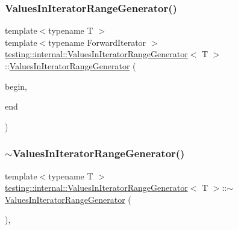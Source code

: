 \subsubsection{\texorpdfstring{Values\+In\+Iterator\+Range\+Generator()}{ValuesInIteratorRangeGenerator()}}
{\footnotesize\ttfamily template$<$typename T $>$ \\
template$<$typename Forward\+Iterator $>$ \\
\hyperlink{classtesting_1_1internal_1_1ValuesInIteratorRangeGenerator}{testing\+::internal\+::\+Values\+In\+Iterator\+Range\+Generator}$<$ T $>$\+::\hyperlink{classtesting_1_1internal_1_1ValuesInIteratorRangeGenerator}{Values\+In\+Iterator\+Range\+Generator} (\begin{DoxyParamCaption}\item[{Forward\+Iterator}]{begin,  }\item[{Forward\+Iterator}]{end }\end{DoxyParamCaption})\hspace{0.3cm}{\ttfamily [inline]}}

\mbox{\label{classtesting_1_1internal_1_1ValuesInIteratorRangeGenerator_a9070d5b79803164625d3aa77a1659e9f}} 
\subsubsection{\texorpdfstring{$\sim$\+Values\+In\+Iterator\+Range\+Generator()}{~ValuesInIteratorRangeGenerator()}}
{\footnotesize\ttfamily template$<$typename T $>$ \\
\hyperlink{classtesting_1_1internal_1_1ValuesInIteratorRangeGenerator}{testing\+::internal\+::\+Values\+In\+Iterator\+Range\+Generator}$<$ T $>$\+::$\sim$\hyperlink{classtesting_1_1internal_1_1ValuesInIteratorRangeGenerator}{Values\+In\+Iterator\+Range\+Generator} (\begin{DoxyParamCaption}{ }\end{DoxyParamCaption})\hspace{0.3cm}{\ttfamily [inline]}, {\ttfamily [override]}}



